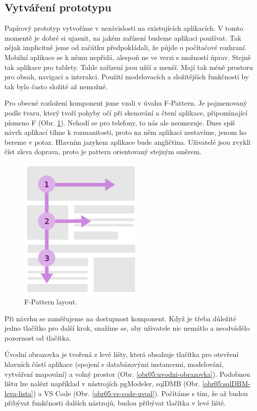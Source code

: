 \subsection{Vytváření prototypu}

Papírový prototyp vytvoříme v nezávislosti na existujících aplikacích. V tomto momentě je dobré si ujasnit, na jakém zařízení budeme aplikaci používat. Tak nějak implicitně jsme od začátku předpokládali, že půjde o počítačové rozhraní. Mobilní aplikace se k němu nepřidá, alespoň ne ve verzi s možností úprav. Stejně tak aplikace pro tablety. Tahle zařízení jsou užší a menší. Mají tak méně prostoru pro obsah, navigaci a interakci. Použití modelovacích a složitějších funkčností by tak bylo často složité až nemožné.

Pro obecné rozložení komponent jsme vzali v úvahu F-Pattern. Je pojmenovaný podle tvaru, který tvoří pohyby očí při skenování a čtení aplikace, připomínající písmeno F (Obr. \ref{obr05:fpattern}). Nehodí se pro telefony, to nás ale neomezuje. Dnes spíš návrh aplikací tíhne k rozmanitosti, proto na něm aplikaci nestavíme, jenom ho bereme v potaz. Hlavním jazykem aplikace bude angličtina. Uživatelé jsou zvyklí číst zleva doprava, proto je pattern orientovaný stejným směrem.

\begin{figure}[htb]
    \centering
    \includegraphics[height=70mm]{../img/F-Pattern}
    \caption{F-Pattern layout.}
    \label{obr05:fpattern}
  \end{figure}

Při návrhu se zaměřujeme na dostupnost komponent. Když je třeba důležité jedno tlačítko pro další krok, snažíme se, aby uživatele nic nemátlo a neodvádělo pozornost od tlačítka. 

Úvodní obrazovka je tvořená z levé lišty, která obsahuje tlačítka pro otevření hlavních částí aplikace (spojení s databázovými instancemi, modelování, vytváření mapování) a volný prostor (Obr. \ref{obr05:uvodni-obrazovka}). Podobnou lištu lze nalézt například v nástrojích pgModeler, sqlDMB (Obr. \ref{obr05:sqlDBM-leva-lista}) a VS Code (Obr. \ref{obr05:vs-code-uvod}). Počítáme s tím, že až budou přibývat funkčnosti dalších nástrojů, budou přibývat tlačítka v levé liště.

